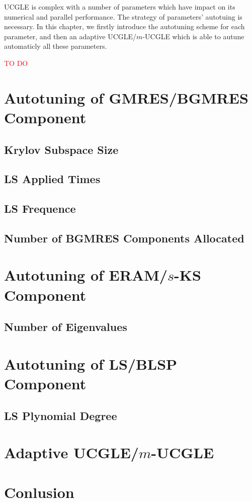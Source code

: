 \begin{displayquote}
	\textsf{UCGLE is complex with a number of parameters which have impact on its numerical and parallel performance. The strategy of parameters' autotuing is necessary. In this chapter, we firstly introduce the autotuning scheme for each parameter, and then an adaptive UCGLE/$m$-UCGLE which is able to autune automaticly all these parameters.}
\end{displayquote}

\vspace{1in}

\textcolor{red}{TO DO}

\section{Autotuning of GMRES/BGMRES Component}
\subsection{Krylov Subspace Size}
\subsection{LS Applied Times}
\subsection{LS Frequence}
\subsection{Number of BGMRES Components Allocated}
\section{Autotuning of ERAM/$s$-KS Component}
\subsection{Number of Eigenvalues}
\section{Autotuning of LS/BLSP Component}
\subsection{LS Plynomial Degree}
\section{Adaptive UCGLE/$m$-UCGLE}
\section{Conlusion}

\clearemptydoublepage